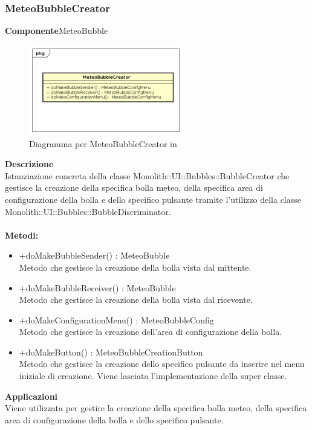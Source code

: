 \subsubsection{MeteoBubbleCreator}
\textbf{Componente}MeteoBubble\\
   \FloatBarrier
   \begin{figure}[ht]
   \centering
   \includegraphics[width=0.6\textwidth]{img/single-MeteoBubbleCreator}
   \caption{{Diagramma per MeteoBubbleCreator in }}
\end{figure}
\FloatBarrier
\textbf{Descrizione}\\
Istanziazione concreta della classe Monolith::UI::Bubbles::BubbleCreator che gestisce la creazione della specifica bolla meteo, della specifica area di configurazione della bolla e dello specifico pulsante tramite l'utilizzo della classe Monolith::UI::Bubbles::BubbleDiscriminator.
\\
\\
\textbf{Metodi:} 
\begin{itemize}
\item +doMakeBubbleSender() : MeteoBubble 
\\
Metodo che gestisce la creazione della bolla vista dal mittente.
\item +doMakeBubbleReceiver() : MeteoBubble 
\\
Metodo che gestisce la creazione della bolla vista dal ricevente.
\item +doMakeConfigurationMenu() : MeteoBubbleConfig 
\\
Metodo che gestisce la creazione dell'area di configurazione della bolla.
\item +doMakeButton() : MeteoBubbleCreationButton 
\\
Metodo che gestisce la creazione dello specifico pulsante da inserire nel menu iniziale di creazione. Viene lasciata l'implementazione della super classe.
\end{itemize} 


\textbf{Applicazioni}\\
Viene utilizzata per gestire la creazione della specifica bolla meteo, della specifica area di configurazione della bolla e dello specifico pulsante. 


